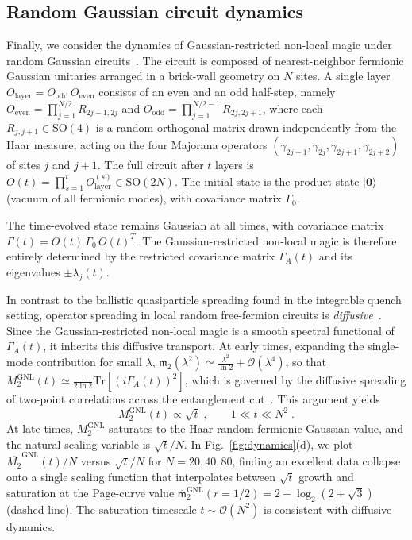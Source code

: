 \documentclass[prx,twocolumn,superscriptaddress,aps,10pt, frontmatterverbose, reprint,footinbib,longbibliography=true]{revtex4-2}
\begin{document}
\subsection{Random Gaussian circuit dynamics}
Finally, we consider the dynamics of Gaussian-restricted non-local magic under random Gaussian circuits~\cite{tirrito2025magicphasetransitionsmonitored}.
The circuit is composed of nearest-neighbor fermionic Gaussian unitaries arranged in a brick-wall geometry on $N$ sites.
A single layer $O_{\mathrm{layer}} = O_{\mathrm{odd}}\,O_{\mathrm{even}}$ consists of an even and an odd half-step, namely $O_{\mathrm{even}} = \prod_{j=1}^{N/2} R_{2j-1,2j}$ and $O_{\mathrm{odd}} = \prod_{j=1}^{N/2-1} R_{2j,2j+1}$, where each $R_{j,j+1} \in \mathrm{SO}(4)$ is a random orthogonal matrix drawn independently from the Haar measure, acting on the four Majorana operators $(\gamma_{2j-1}, \gamma_{2j}, \gamma_{2j+1}, \gamma_{2j+2})$ of sites $j$ and $j+1$.
The full circuit after $t$ layers is $O(t) = \prod_{s=1}^t O_{\mathrm{layer}}^{(s)} \in \mathrm{SO}(2N)$.
The initial state is the product state $|\mathbf{0}\rangle$ (vacuum of all fermionic modes), with covariance matrix $\Gamma_0$. 

The time-evolved state remains Gaussian at all times, with covariance matrix $\Gamma(t) = O(t)\,\Gamma_0\,O(t)^T$.
The Gaussian-restricted non-local magic is therefore entirely determined by the restricted covariance matrix $\Gamma_A(t)$ and its eigenvalues $\pm\lambda_j(t)$.

In contrast to the ballistic quasiparticle spreading found in the integrable quench setting, operator spreading in local random free-fermion circuits is \emph{diffusive}~\cite{dias2021diffusiveoperatorspreadingrandom,swann}.
Since the Gaussian-restricted non-local magic is a smooth spectral functional of $\Gamma_A(t)$, it inherits this diffusive transport.
At early times, expanding the single-mode contribution for small $\lambda$, $\mathfrak{m}_2(\lambda^2) \simeq \frac{\lambda^2}{\ln 2} + \mathcal{O}(\lambda^4)$, so that $M_2^{\mathrm{GNL}}(t) \simeq \frac{1}{2\ln 2}\mathrm{Tr}[(i\Gamma_A(t))^2]$, which is governed by the diffusive spreading of two-point correlations across the entanglement cut~\cite{dias2021diffusiveoperatorspreadingrandom}.
This argument yields
\begin{equation}
    M_2^{\mathrm{GNL}}(t) \propto \sqrt{t}\;, \qquad 1 \ll t \ll N^2\;.
\end{equation}
At late times, $M_2^{\mathrm{GNL}}$ saturates to the Haar-random fermionic Gaussian value, and the natural scaling variable is $\sqrt{t}/N$.
In Fig.~\ref{fig:dynamics}(d), we plot $\overline{M_2}^{\mathrm{GNL}}(t)/N$ versus $\sqrt{t}/N$ for $N = 20, 40, 80$, finding an excellent data collapse onto a single scaling function that interpolates between $\sqrt{t}$ growth and saturation at the Page-curve value $\overline{\mathsf{m}}_{2}^{\mathrm{GNL}}(r=1/2)=2-\log_2(2+\sqrt{3})$  (dashed line).
The saturation timescale $t\sim\mathcal{O}(N^2)$ is consistent with diffusive dynamics.
\end{document}
